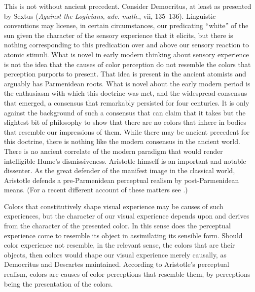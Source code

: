 This is not without ancient precedent. Consider Democritus, at least as presented by Sextus \citeauthor{Empiricus:1997kx} (\emph{Against the Logicians}, \emph{adv. math.}, vii, 135--136). Linguistic conventions may license, in certain circumstances, our predicating ``white'' of the sun given the character of the sensory experience that it elicits, but there is nothing corresponding to this predication over and above our sensory reaction to atomic stimuli. What is novel in early modern thinking about sensory experience is not the idea that the causes of color perception do not resemble the colors that perception purports to present. That idea is present in the ancient atomists and arguably has Parmenidean roots. What is novel about the early modern period is the enthusiasm with which this doctrine was met, and the widespread consensus that emerged, a consensus that remarkably persisted for four centuries. It is only against the background of such a consensus that \citet[]{Hume:1748zr} can claim that it takes but the slightest bit of philosophy to show that there are no colors that inhere in bodies that resemble our impressions of them. While there may be ancient precedent for this doctrine, there is nothing like the modern consensus in the ancient world. There is no ancient correlate of the modern paradigm that would render intelligible Hume's dismissiveness. Aristotle himself is an important and notable dissenter. As the great defender of the manifest image in the classical world, Aristotle defends a pre-Parmenidean perceptual realism by post-Parmenidean means. (For a recent different account of these matters see \citealt{Lee:2011ys}.)

Colors that constitutively shape visual experience may be causes of such experiences, but the character of our visual experience depends upon and derives from the character of the presented color. In this sense does the perceptual experience come to resemble its object in assimilating its sensible form. Should color experience not resemble, in the relevant sense, the colors that are their objects, then colors would shape our visual experience merely causally, as Democritus and Descartes maintained. According to Aristotle's perceptual realism, colors are causes of color perceptions that resemble them, by perceptions being the presentation of the colors.

